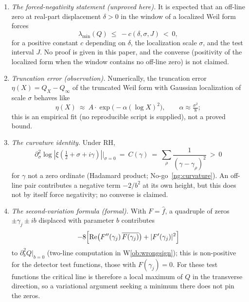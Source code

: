 \documentclass[11pt]{amsart}
\theoremstyle{definition}
\theoremstyle{remark}
\theoremstyle{definition}
\renewcommand{\Re}{\operatorname{Re}}
\begin{document}
\begin{enumerate}[label=(\roman*),leftmargin=2.2em]

\item \emph{The forced-negativity statement (unproved here).} It is expected that an off-line zero at
real-part displacement $\delta>0$ in the window of a localized Weil form forces
\[
   \lambda_{\min}(Q)\ \le\ -c(\delta,\sigma,J)\ <\ 0,
\]
for a positive constant $c$ depending on $\delta$, the localization scale $\sigma$, and the test interval
$J$. No proof is given in this paper, and the converse (positivity of the localized form when the window
contains no off-line zero) is not claimed.

\item \emph{Truncation error (observation).} Numerically, the truncation error $\eta(X)=Q_X-Q_\infty$ of
the truncated Weil form with Gaussian localization of scale $\sigma$ behaves like
\[
   \eta(X)\ \approx\ A\cdot\exp\bigl(-\alpha(\log X)^2\bigr),\qquad\alpha\approx\tfrac{\sigma^2}{8};
\]
this is an empirical fit (no reproducible script is supplied), not a proved bound.

\item \emph{The curvature identity.} Under RH,
\[
   \partial_\sigma^2\log|\xi(\tfrac12+\sigma+i\gamma)|\big|_{\sigma=0}
   \ =\ C(\gamma)\ =\ \sum_\rho\frac{1}{(\gamma-\gamma_\rho)^2}\ >\ 0
\]
for $\gamma$ not a zero ordinate (Hadamard product; No-go~\ref{ng:curvature}). An off-line pair contributes
a negative term $-2/b^2$ at its own height, but this does not by itself force negativity; no converse is
claimed.

\item \emph{The second-variation formula (formal).} With $F=\widehat f$, a quadruple of zeros
$\pm\gamma_j\pm ib$ displaced with parameter $b$ contributes
\[
   -8\Bigl[\Re\bigl(F''(\gamma_j)\,\overline{F(\gamma_j)}\bigr)+|F'(\gamma_j)|^2\Bigr]
\]
to $\partial_b^2Q|_{b=0}$ (two-line computation in W\ref{ob:wrongsign}); this is non-positive for the
detector test functions, those with $F(\gamma_j)=0$. For these test functions the critical line is therefore a local maximum of $Q$ in
the transverse direction, so a variational argument seeking a minimum there does not pin the zeros.


\end{enumerate}
\end{document}

